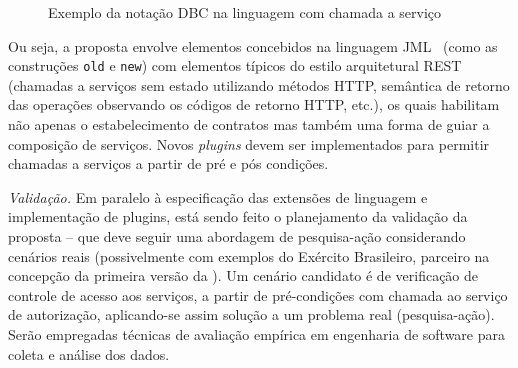 \begin{figure}[htb]
\begin{scriptsize}

\end{scriptsize}
\caption{Exemplo da notação DBC na linguagem \neoidl{} com chamada a serviço}
\label{lst:DBCService}
\end{figure}

Ou seja, a proposta envolve elementos concebidos na linguagem JML~\cite{leavens} 
(como as constru\c c\~{o}es \texttt{old} e \texttt{new}) com elementos 
t\'{i}picos do estilo arquitetural REST (chamadas 
a servi\c cos sem estado utilizando m\'{e}todos HTTP, sem\^{a}ntica de retorno 
das opera\c c\~{o}es observando os c\'{o}digos de retorno HTTP, etc.), os quais 
habilitam n\~{a}o apenas o estabelecimento de contratos mas tamb\'{e}m uma 
forma de guiar a composi\c c\~{a}o de servi\c cos. 
Novos \textit{plugins} \neoidl{} devem ser implementados para permitir chamadas
a serviços a partir de pré e pós condições. 








\emph{Valida\c c\~{a}o.} Em paralelo \`{a} especifica\c c\~{a}o 
das extens\~{o}es de linguagem \neoidl{} e implementa\c c\~{a}o de 
plugins, est\'{a} sendo feito o planejamento da 
valida\c c\~{a}o da proposta -- que deve seguir uma abordagem 
de pesquisa-a\c c\~{a}o considerando cen\'{a}rios reais (possivelmente 
com exemplos do Ex\'{e}rcito Brasileiro, parceiro na 
concep\c c\~{a}o da primeira vers\~{a}o da \neoidl). Um cenário candidato é
de verificação de controle de acesso aos serviços, a partir de pré-condições com
chamada ao serviço de autorização, aplicando-se assim solução a um problema
real (pesquisa-a\c c\~{a}o). Serão empregadas técnicas de avaliação
empírica em engenharia de software \cite{shull2008guide} para coleta e
análise dos dados.
